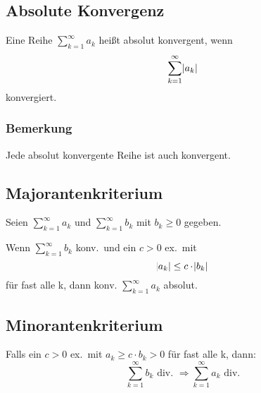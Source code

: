 \subsection{Absolute Konvergenz}
Eine Reihe $\sum_{k=1}^\infty a_k$ heißt absolut konvergent, wenn
\begin{equation*}
    \sum_{k=1}^\infty \abs{a_k}
\end{equation*}
konvergiert.

\subsubsection{Bemerkung} Jede absolut konvergente Reihe ist auch konvergent.

\subsection{Majorantenkriterium}
Seien $\sum_{k=1}^\infty a_k$ und $\sum_{k=1}^\infty b_k$ mit $b_k \geq 0$
gegeben.

Wenn $\sum_{k=1}^\infty b_k$ konv.\ und ein $c>0$ ex.\ mit
$$\abs{a_k} \leq c \cdot \abs{b_k}$$ für fast alle k, dann konv.
$\sum_{k=1}^\infty a_k$ absolut.

\subsection{Minorantenkriterium}
Falls ein $c > 0$ ex.\ mit $a_k \geq c \cdot b_k > 0$ für fast alle k,
dann:
\begin{equation*}
    \sum_{k=1}^\infty b_k \text{ div. }
    \Rightarrow \sum_{k=1}^\infty a_k \text{ div.}
\end{equation*}

